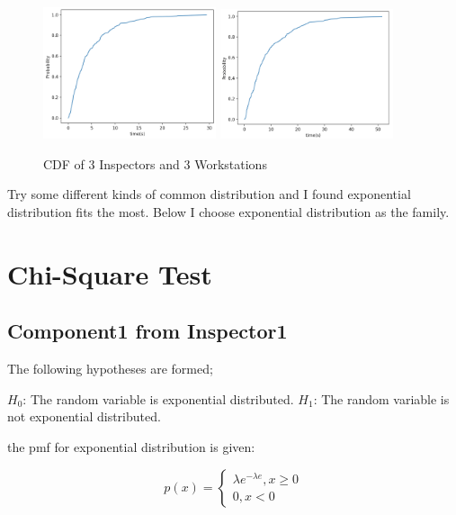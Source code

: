 \documentclass{article}
\begin{document}
\begin{figure}[htbp]
\begin{center}
\includegraphics[width=2in]{cdf5.png}
\includegraphics[width=2in]{cdf6.png}
\caption{CDF of 3 Inspectors and 3 Workstations}
\label{cdf}
\end{center}
\end{figure}
Try some different kinds of common distribution and I found exponential distribution fits the most.
Below I choose exponential distribution as the family.


\section{Chi-Square Test}
\subsection{Component1 from Inspector1}
The following hypotheses are formed;

$H_0$: The random variable is exponential distributed.
$H_1$: The random variable is not exponential distributed.

the pmf for exponential distribution is given:

\begin{equation}
p(x) = \left\{
\begin{array}{rl}
\lambda e^{-\lambda e}, x\geq 0\\
0, x<0
\end{array}
\right.
\end{equation}
\end{document}
